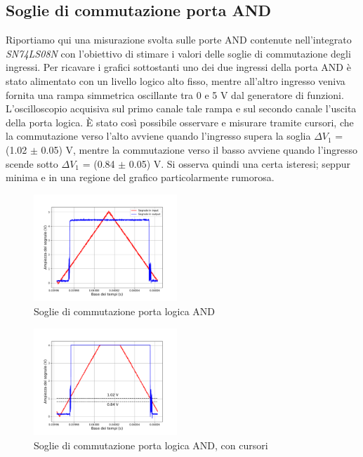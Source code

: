 \documentclass[journal]{IEEEtran}
\begin{document}
\begin{appendices}

\section{Soglie di commutazione porta AND}

Riportiamo qui una misurazione svolta sulle porte AND contenute nell'integrato \textit{SN74LS08N} con l'obiettivo di stimare i valori delle soglie di commutazione degli ingressi. Per ricavare i grafici sottostanti uno dei due ingressi della porta AND è stato alimentato con un livello logico alto fisso, mentre all'altro ingresso veniva fornita una rampa simmetrica oscillante tra 0 e 5 V dal generatore di funzioni. L'oscilloscopio acquisiva sul primo canale tale rampa e sul secondo canale l'uscita della porta logica. È stato così possibile osservare e misurare tramite cursori, che la commutazione verso l'alto avviene quando l'ingresso supera la soglia ${\Delta}V_1$ = (1.02 $\pm$ 0.05) V, mentre la commutazione verso il basso avviene quando l'ingresso scende sotto ${\Delta}V_1$ = (0.84 $\pm$ 0.05) V. Si osserva quindi una certa isteresi; seppur minima e in una regione del grafico particolarmente rumorosa.

\begin{figure}[H]%
\begin{center}
\includegraphics[width=0.48\textwidth]{analysis/output/and-switching.pdf}
\caption{Soglie di commutazione porta logica AND}
\label{fig:AND-switching}
\end{center}
\end{figure}



\begin{figure}[H]%
\begin{center}
\includegraphics[width=0.48\textwidth]{analysis/output/and-switching2.pdf}
\caption{Soglie di commutazione porta logica AND, con cursori}
\label{fig:AND-switching-cursors}
\end{center}
\end{figure}


\end{appendices}
\end{document}
